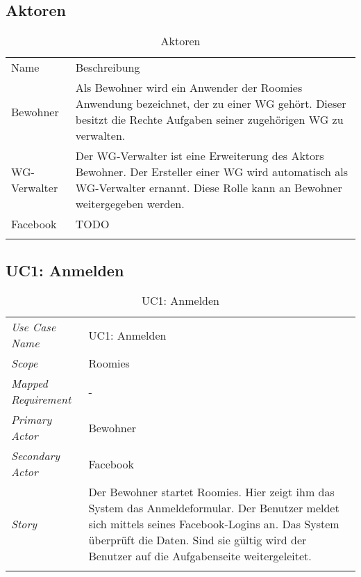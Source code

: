 \subsection{Aktoren}
\begin{table}[H]
	\tablestyle
	\tablealtcolored
	\begin{tabularx}{\textwidth}{lX}
		\tableheadcolor
		\tablehead Name &
		\tablehead Beschreibung \tabularnewline
		\tablebody
			Bewohner &
			Als Bewohner wird ein Anwender der Roomies Anwendung bezeichnet, der zu einer WG gehört. \newline
			Dieser besitzt die Rechte Aufgaben seiner zugehörigen WG zu verwalten.
			\tabularnewline
			WG-Verwalter &
			Der WG-Verwalter ist eine Erweiterung des Aktors Bewohner. Der Ersteller einer WG wird automatisch als WG-Verwalter ernannt. Diese Rolle kann an Bewohner weitergegeben werden.
			\tabularnewline
			Facebook &
			TODO
			\tabularnewline
		\tableend
	\end{tabularx}
	\caption{Aktoren}
\end{table}

\subsection{UC1: Anmelden}
\begin{table}[H]
	\tablestyle
	\tablealtcolored
	\begin{tabularx}{\textwidth}{lX}
		\tablebody
			\textit{Use Case Name} &
			UC1: Anmelden
			\tabularnewline
			\textit{Scope} &
			Roomies
			\tabularnewline
			\textit{Mapped Requirement} &
			-
			\tabularnewline
			\textit{Primary Actor} &
			Bewohner
			\tabularnewline
			\textit{Secondary Actor} &
			Facebook
			\tabularnewline
			\textit{Story} &
			Der Bewohner startet Roomies. Hier zeigt ihm das System das Anmeldeformular. Der Benutzer meldet sich mittels seines Facebook-Logins an. Das System überprüft die Daten. Sind sie gültig wird der Benutzer auf die Aufgabenseite weitergeleitet.
			\tabularnewline
		\tableend
	\end{tabularx}
	\caption{UC1: Anmelden}
\end{table}


